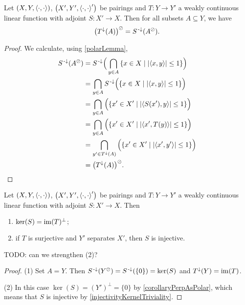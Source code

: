 \begin{proposition} \label{adjointPreimagePolarLemma}
Let $\sSet{X,Y,\pair{\cdot,\cdot}}$, $\sSet{X',Y',\pair{\cdot,\cdot}'}$ be pairings and $T: Y\to Y'$ a weakly continuous linear function with adjoint $S: X'\to X$. Then for all subsets $A\subseteq Y$, we have
\[ \big(T^{\downarrow}(A)\big)^\oslash = S^{{\text{\hspace{0.15em}-}\downarrow}}(A^\oslash). \]
\end{proposition}
\begin{proof}
We calculate, using \ref{polarLemma},
\begin{align*}
S^{\preimf}(A^\pol) &= S^{\preimf}\Big(\bigcap_{y\in A}\setbuilder{x\in X}{\abspair{x,y}\leq 1}\Big) \\
&= \bigcap_{y\in A}S^{\preimf}\Big(\setbuilder{x\in X}{\abspair{x,y}\leq 1}\Big) \\
&= \bigcap_{y\in A}\Big(\setbuilder{x'\in X'}{\abspair{S(x'),y}\leq 1}\Big) \\
&= \bigcap_{y\in A}\Big(\setbuilder{x'\in X'}{\abspair{x',T(y)}\leq 1}\Big) \\
&= \bigcap_{y'\in T^{\imf}(A)}\Big(\setbuilder{x'\in X'}{\abspair{x',y'}\leq 1}\Big) \\
&= \big(T^{\imf}(A)\big)^\pol.
\end{align*}
\end{proof}
\begin{corollary}
Let $\sSet{X,Y,\pair{\cdot,\cdot}}$, $\sSet{X',Y',\pair{\cdot,\cdot}'}$ be pairings and $T: Y\to Y'$ a weakly continuous linear function with adjoint $S: X'\to X$. Then
\begin{enumerate}
\item $\ker(S) = \operatorname{im}(T)^\perp$;
\item if $T$ is surjective and $Y'$ separates $X'$, then $S$ is injective.
\end{enumerate}
\end{corollary}
TODO: can we strengthen (2)?
\begin{proof}
(1) Set $A = Y$. Then $S^{\text{\hspace{0.15em}-}\downarrow}(Y^\oslash) = S^{\text{\hspace{0.15em}-}\downarrow}(\{0\}) = \ker(S)$ and $T^\downarrow(Y) = \operatorname{im}(T)$.

(2) In this case $\ker(S) = (Y')^\perp = \{0\}$ by \ref{corollaryPerpAsPolar}, which means that $S$ is injective by \ref{injectivityKernelTriviality}.
\end{proof}

